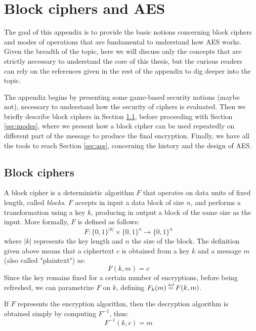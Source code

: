 \documentclass[12pt,a4paper]{book}
\newcommand\defeq{\stackrel{\mathclap{\normalfont\mbox{\tiny def}}}{=}}
\theoremstyle{definition}
\begin{document}
	\chapter{Block ciphers and AES}\label{appendix:aes}
	The goal of this appendix is to provide the basic notions concerning block ciphers and modes of operations that are fundamental to understand how AES works. Given the breadth of the topic, here we will discuss only the concepts that are strictly necessary to understand the core of this thesis, but the curious readers can rely on the references given in the rest of the appendix to dig deeper into the topic.
	
	The appendix begins by presenting some game-based security notions (maybe not), necessary to understand how the security of ciphers is evaluated. Then we briefly describe block ciphers in Section \ref{sec:block-ciphers}, before proceeding with Section \ref{sec:modes}, where we present how a block cipher can be used repeatedly on different part of the message to produce the final encryption. Finally, we have all the tools to reach Section \ref{sec:aes}, concerning the history and the design of AES.
	
	\section{Block ciphers}\label{sec:block-ciphers}
	A block cipher is a deterministic algorithm $F$ that operates on data units of fixed length, called \textit{blocks}. $F$ accepts in input a data block of size $n$, and performs a transformation using a key $k$, producing in output a block of the same size as the input. More formally, $F$ is defined as follows:
	\[
	F: \{0,1\}^{|k|} \times \{0,1\}^n \rightarrow \{0,1\}^n
	\]
	where $|k|$ represents the key length and $n$ the size of the block. The definition given above means that a ciphertext $c$ is obtained from a key $k$ and a message $m$ (also called "plaintext") as:
	\[
	F(k,m) = c
	\]
	Since the key remains fixed for a certain number of encryptions, before being refreshed, we can parametrize $F$ on $k$, defining $F_k(m) \defeq F(k,m)$.
	
	If $F$ represents the encryption algorithm, then the decryption algorithm is obtained simply by computing $F^{-1}$, thus:
	\[
	F^{-1}(k,c) = m
	\]
	
\end{document}
